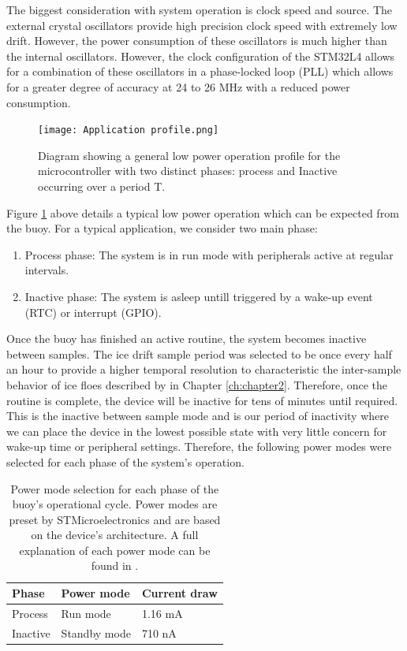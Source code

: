 The biggest consideration with system operation is clock speed and source. The external crystal oscillators provide high precision clock speed with extremely low drift. However, the power consumption of these oscillators is much higher than the internal oscillators. However, the clock configuration of the STM32L4 allows for a combination of these oscillators in a phase-locked loop (PLL) which allows for a greater degree of accuracy at 24 to 26 MHz with a reduced power consumption. 

\begin{figure}[H]
	\centering
	\texttt{[image: Application profile.png]}
	\caption{Diagram showing a general low power operation profile for the microcontroller with two distinct phases: process and Inactive occurring over a period T.}
	\label{fig:appr}
\end{figure}

Figure \ref{fig:appr} above details a typical low power operation which can be expected from the buoy. For a typical application, we consider two main phase:

\begin{enumerate}
	\item Process phase: The system is in run mode with peripherals active at regular intervals.
	\item Inactive phase: The system is asleep untill triggered by a wake-up event (RTC) or interrupt (GPIO).
\end{enumerate}

Once the buoy has finished an active routine, the system becomes inactive between samples. The ice drift sample period was selected to be once every half an hour to provide a higher temporal resolution to characteristic the inter-sample behavior of ice floes described by \textcite{vichi2019effects} in Chapter \ref{ch:chapter2}. Therefore, once the routine is complete, the device will be inactive for tens of minutes until required. This is the inactive between sample mode and is our period of inactivity where we can place the device in the lowest possible state with very little concern for wake-up time or peripheral settings. Therefore, the following power modes were selected for each phase of the system's operation.

\begin{table}[H]
	\centering
	\caption{Power mode selection for each phase of the buoy's operational cycle. Power modes are preset by STMicroelectronics and are based on the device's architecture. A full explanation of each power mode can be found in \cite{stm32l4ref}.}
	\begin{tabular}{lll}
		\hline 
	\textbf{Phase} & \textbf{Power mode} & \textbf{Current draw}\\
		\hline
		\hline
		Process & Run mode & 1.16 mA\\
		Inactive & Standby mode & 710 nA\\
		\hline
		\hline
	\end{tabular}
	\label{tab:powmode_cycle}
\end{table}

